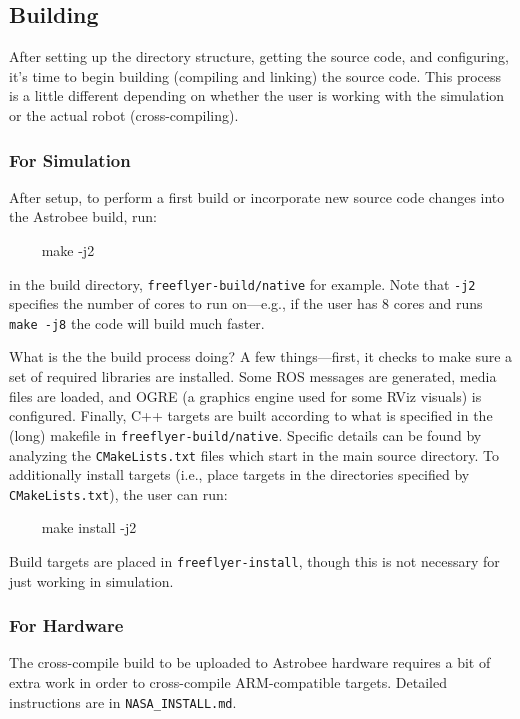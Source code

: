 \documentclass{article}
\begin{document}
\subsection{Building}

After setting up the directory structure, getting the source code, and configuring, it's time to begin building (compiling and linking) the source code. This process is a little different depending on whether the user is working with the simulation or the actual robot (cross-compiling).

\subsubsection{For Simulation}
After setup, to perform a first build or incorporate new source code changes into the Astrobee build, run:
\begin{markdown}
~~~~
make -j2
~~~~
\end{markdown} 

\noindent{}in the build directory, \texttt{freeflyer-build/native} for example. Note that \texttt{-j2} specifies the number of cores to run on---e.g., if the user has 8 cores and runs \texttt{make -j8} the code will build much faster.

What is the the build process doing? A few things---first, it checks to make sure a set of required libraries are installed. Some ROS messages are generated, media files are
loaded, and OGRE (a graphics engine used for some RViz visuals) is configured. Finally, C++ targets are built according to what is specified in the (long) makefile in 
\texttt{freeflyer-build/native}. Specific details can be found by analyzing the \texttt{CMakeLists.txt} files which start in the main source directory. To additionally install targets (i.e., place targets in the directories specified by \texttt{CMakeLists.txt}), the user can run:

\begin{markdown}
~~~~
make install -j2
~~~~
\end{markdown}

Build targets are placed in \texttt{freeflyer-install}, though this is not necessary for just working in simulation.

\subsubsection{For Hardware}

The cross-compile build to be uploaded to Astrobee hardware requires a bit of extra work in order to cross-compile ARM-compatible targets. Detailed instructions are in \texttt{NASA\_INSTALL.md}.
\end{document}

